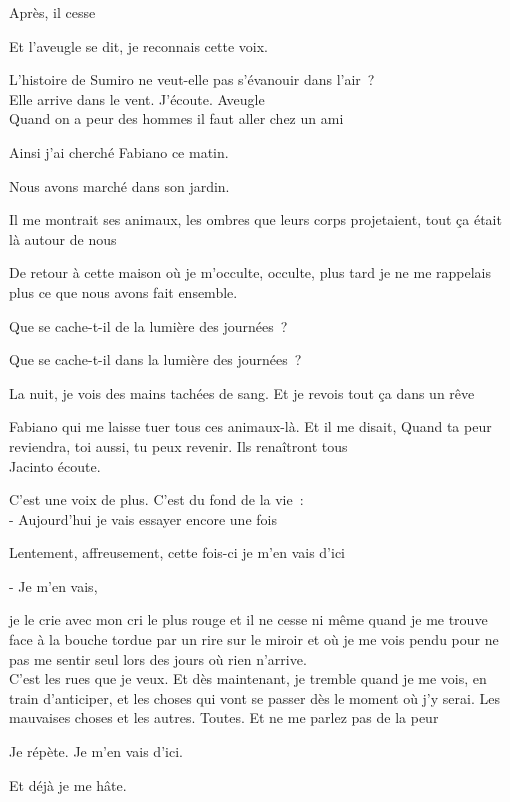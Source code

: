 Après, il cesse

Et l'aveugle se dit, je reconnais cette voix.

L'histoire de Sumiro ne veut-elle pas s'évanouir dans l'air~?\\

Elle arrive dans le vent. J'écoute. Aveugle\\

Quand on a peur des hommes il faut aller chez un ami

Ainsi j'ai cherché Fabiano ce matin.

Nous avons marché dans son jardin.

Il me montrait ses animaux, les ombres que leurs corps projetaient, tout
ça était là autour de nous

De retour à cette maison où je m'occulte, occulte, plus tard je ne me
rappelais plus ce que nous avons fait ensemble.

Que se cache-t-il de la lumière des journées~?

Que se cache-t-il dans la lumière des journées~?

La nuit, je vois des mains tachées de sang. Et je revois tout ça dans un
rêve

Fabiano qui me laisse tuer tous ces animaux-là. Et il me disait, Quand
ta peur reviendra, toi aussi, tu peux revenir. Ils renaîtront tous\\

Jacinto écoute.

C'est une voix de plus. C'est du fond de la vie~:\\

- Aujourd'hui je vais essayer encore une fois

Lentement, affreusement, cette fois-ci je m'en vais d'ici

- Je m'en vais,

je le crie avec mon cri le plus rouge et il ne cesse ni même quand je me
trouve face à la bouche tordue par un rire sur le miroir et où je me
vois pendu pour ne pas me sentir seul lors des jours où rien n'arrive.\\

C'est les rues que je veux. Et dès maintenant, je tremble quand je me
vois, en train d'anticiper, et les choses qui vont se passer dès le
moment où j'y serai. Les mauvaises choses et les autres. Toutes. Et ne
me parlez pas de la peur

Je répète. Je m'en vais d'ici.

Et déjà je me hâte.


